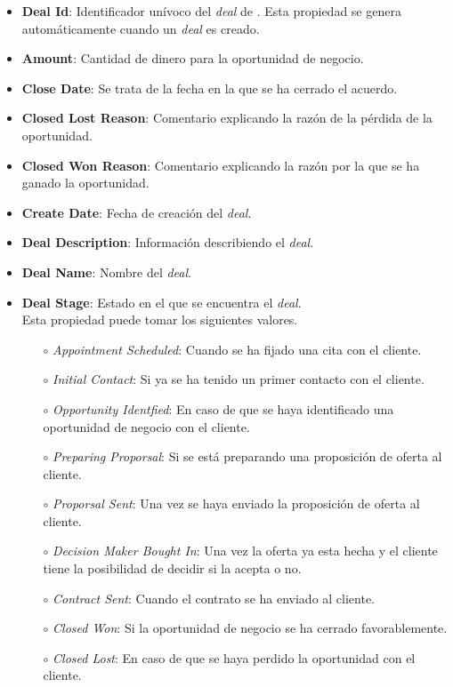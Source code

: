 		\begin{itemize}
			\item \textbf{Deal Id}: Identificador unívoco del \textit{deal} de \hs. Esta propiedad se genera automáticamente cuando un \textit{deal} es creado.
			\item \textbf{Amount}: Cantidad de dinero para la oportunidad de negocio.
			\item \textbf{Close Date}: Se trata de la fecha en la que se ha cerrado el acuerdo.
			\item \textbf{Closed Lost Reason}: Comentario explicando la razón de la pérdida de la oportunidad.
			\item \textbf{Closed Won Reason}: Comentario explicando la razón por la que se ha ganado la oportunidad.
			\item \textbf{Create Date}: Fecha de creación del \textit{deal}.
			\item \textbf{Deal Description}: Información describiendo el \textit{deal}.
			\item \textbf{Deal Name}: Nombre del \textit{deal}.
			\item \textbf{Deal Stage}: Estado en el que se encuentra el \textit{deal}.\\ %
			
			Esta propiedad puede tomar los siguientes valores.
				\begin{itemize}
					\item[$\circ$] \textit{Appointment Scheduled}: Cuando se ha fijado una cita con el cliente.
					\item[$\circ$] \textit{Initial Contact}: Si ya se ha tenido un primer contacto con el cliente.
					\item[$\circ$] \textit{Opportunity Identfied}: En caso de que se haya identificado una oportunidad de negocio con el cliente.
					\item[$\circ$] \textit{Preparing Proporsal}: Si se está preparando una proposición de oferta al cliente.
					\item[$\circ$] \textit{Proporsal Sent}: Una vez se haya enviado la proposición de oferta al cliente.
					\item[$\circ$] \textit{Decision Maker Bought In}: Una vez la oferta ya esta hecha y el cliente tiene la posibilidad de decidir si la acepta o no.
					\item[$\circ$] \textit{Contract Sent}: Cuando el contrato se ha enviado al cliente.
					\item[$\circ$] \textit{Closed Won}: Si la oportunidad de negocio se ha cerrado favorablemente.
					\item[$\circ$] \textit{Closed Lost}: En caso de que se haya perdido la oportunidad con el cliente.
				\end{itemize}
			

\end{itemize}
